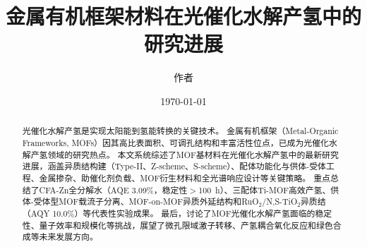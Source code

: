 \documentclass[UTF8, a4paper, 12pt, zihao=-4]{ctexart}
\title{金属有机框架材料在光催化水解产氢中的研究进展}
\author{作者}
\date{\today}
\begin{document}
\maketitle

\begin{abstract}
光催化水解产氢是实现太阳能到氢能转换的关键技术。
金属有机框架（Metal-Organic Frameworks, MOFs）因其高比表面积、可调孔结构和丰富活性位点，已成为光催化水解产氢领域的研究热点。
本文系统综述了MOF基材料在光催化水解产氢中的最新研究进展，涵盖异质结构建（Type-II、Z-scheme、S-scheme）、配体功能化与供体-受体工程、金属掺杂、助催化剂负载、MOF衍生材料和全光谱响应设计等关键策略。
重点总结了CFA-Zn全分解水（AQE 3.09\%，稳定性$>$100~h）、三配体Ti-MOF高效产氢、供体-受体型MOF载流子分离、MOF-on-MOF异质外延结构和RuO$_2$/N,S-TiO$_2$异质结（AQY 10.0\%）等代表性实验成果。
最后，讨论了MOF光催化水解产氢面临的稳定性、量子效率和规模化等挑战，展望了微孔限域激子转移、产氢耦合氧化反应和绿色合成等未来发展方向。
\end{abstract}











\end{document}
